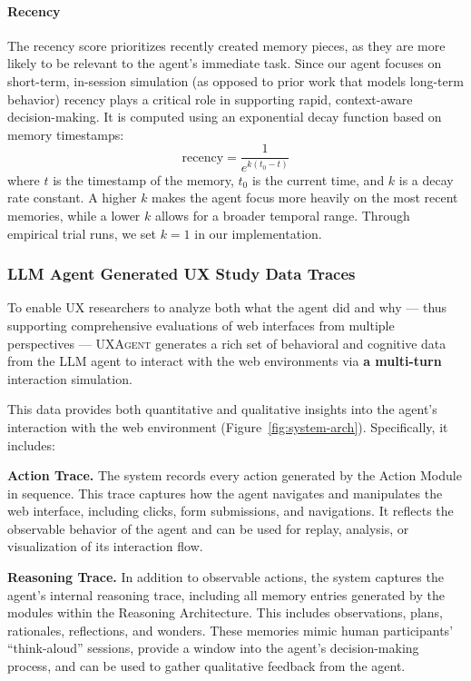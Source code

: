 \documentclass[manuscript,review,anonymous]{acmart}
\DeclareRobustCommand{\projectname}{\textsc{UXAgent}\xspace}
\begin{document}
\paragraph{Recency}  
The recency score prioritizes recently created memory pieces, as they are more likely to be relevant to the agent’s immediate task. Since our agent focuses on short-term, in-session simulation (as opposed to prior work that models long-term behavior) recency plays a critical role in supporting rapid, context-aware decision-making. It is computed using an exponential decay function based on memory timestamps:
\[
    \text{recency} = \frac{1}{e^{k(t_0 - t)}}
\]
where $t$ is the timestamp of the memory, $t_0$ is the current time, and $k$ is a decay rate constant. A higher $k$ makes the agent focus more heavily on the most recent memories, while a lower $k$ allows for a broader temporal range. Through empirical trial runs, we set $k = 1$ in our implementation.

\subsubsection{LLM Agent Generated UX Study Data Traces}  
\label{sec:data-collected}

To enable UX researchers to analyze both what the agent did and why --- thus supporting comprehensive evaluations of web interfaces from multiple perspectives --- \projectname generates a rich set of behavioral and cognitive data from the LLM agent to interact with the web environments via \textbf{ a multi-turn }interaction simulation. 

This data provides both quantitative and qualitative insights into the agent’s interaction with the web environment (Figure~\ref{fig:system-arch}). Specifically, it includes:

\textbf{Action Trace.} The system records every action generated by the Action Module in sequence. This trace captures how the agent navigates and manipulates the web interface, including clicks, form submissions, and navigations. It reflects the observable behavior of the agent and can be used for replay, analysis, or visualization of its interaction flow.

\textbf{Reasoning Trace.} In addition to observable actions, the system captures the agent’s internal reasoning trace, including all memory entries generated by the modules within the Reasoning Architecture. This includes observations, plans, rationales, reflections, and wonders. These memories 
mimic human participants' ``think-aloud'' sessions, provide a window into the agent’s decision-making process, and can be used to gather qualitative feedback from the agent.
\end{document}

